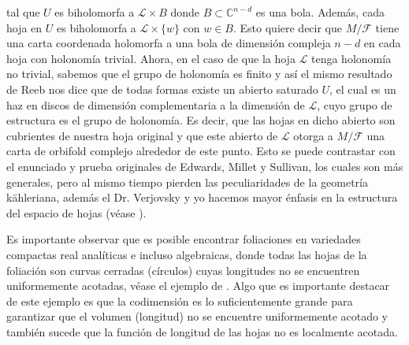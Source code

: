 \documentclass{article}
\newcommand{\co}{\ensuremath{\mathbb C }}
\begin{document}
tal que $U$ es biholomorfa a $\mathcal{L}\times B$ donde $B\subset\co^{n-d}$ es una bola. Adem\'as, cada hoja en $U$ es biholomorfa a $\mathcal{L}\times\{w\}$ con $w\in B$. 
Esto quiere decir que $M/\mathcal{F}$ tiene una carta coordenada holomorfa a una bola de dimensi\'on compleja $n-d$ en cada hoja 
con holonom\'ia trivial. Ahora, en el caso de que la hoja $\mathcal{L}$ tenga holonom\'ia no trivial, sabemos que el grupo de holonom\'ia es 
finito y as\'i el mismo resultado de Reeb nos dice que de todas formas existe un abierto saturado $U$, el cual es un haz en 
discos de dimensi\'on complementaria a la dimensi\'on de $\mathcal{L}$, cuyo grupo de estructura es el grupo de holonom\'ia.
Es decir, que las hojas en dicho abierto son cubrientes de nuestra hoja original y que este abierto de $\mathcal{L}$ otorga a $M/\mathcal{F}$ 
una carta de orbifold complejo alrededor de este punto.
Esto se puede contrastar con el enunciado y prueba originales de Edwards, Millet y Sullivan, los cuales son m\'as generales, pero al mismo tiempo pierden 
las peculiaridades de la geometr\'ia k\"ahleriana, adem\'as el Dr. Verjovsky y yo hacemos mayor \'enfasis en la estructura del 
espacio de hojas (v\'ease \cite{EMS}). 

Es importante observar que es posible encontrar foliaciones en variedades compactas real anal\'iticas e incluso algebraicas, donde 
todas las hojas de la foliaci\'on son curvas cerradas (c\'irculos) cuyas longitudes no se encuentren uniformemente acotadas, v\'ease el ejemplo de \cite{E-V}. 
Algo que es importante destacar de este ejemplo es que la codimensi\'on es lo suficientemente grande 
para garantizar que el volumen (longitud) no se encuentre uniformemente acotado y tambi\'en sucede que la funci\'on de longitud de las hojas 
no es localmente acotada.
\end{document}
